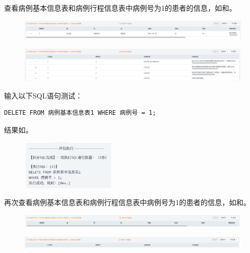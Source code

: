 \documentclass[lang=cn,11pt,a4paper,cite=authornum]{paper}
\begin{document}
查看病例基本信息表和病例行程信息表中病例号为1的患者的信息，如和。
\begin{figure}[!htb]
    \centering
    \includegraphics[width=\textwidth]{./images/res36.png}
    \caption{\label{fig:res36}}
\end{figure}
\begin{figure}[!htb]
    \centering
    \includegraphics[width=\textwidth]{./images/res37.png}
    \caption{\label{fig:res37}}
\end{figure}

输入以下SQL语句测试：
\begin{code}
\begin{verbatim}
DELETE FROM 病例基本信息表1 WHERE 病例号 = 1;
\end{verbatim}
\end{code}

结果如。
\begin{figure}[!htb]
    \centering
    \includegraphics[width=0.4\textwidth]{./images/res38.png}
    \caption{\label{fig:res38}}
\end{figure}

再次查看病例基本信息表和病例行程信息表中病例号为1的患者的信息，如和。
\begin{figure}[!htb]
    \centering
    \includegraphics[width=\textwidth]{./images/res39.png}
    \caption{\label{fig:res39}}
\end{figure}
\begin{figure}[!htb]
    \centering
    \includegraphics[width=\textwidth]{./images/res40.png}
    \caption{\label{fig:res40}}
\end{figure}
\end{document}
